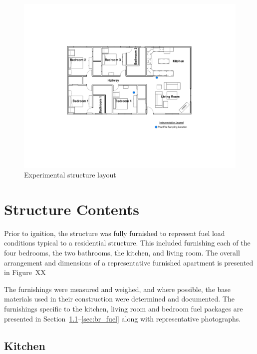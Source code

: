 \documentclass[12pt,oneside]{book}
\begin{document}
\begin{figure}[!htb]
	\includegraphics[width=1.1\linewidth]{../06_Figures/Sampling_Location}
	\caption{Experimental structure layout}
	\label{fig:Floor_Plan}
\end{figure}


\section{Structure Contents}

Prior to ignition, the structure was fully furnished to represent fuel load conditions typical to a residential structure. This included furnishing each of the four bedrooms, the two bathrooms, the kitchen, and living room. The overall arrangement and dimensions of a representative furnished apartment is presented in Figure~XX


The furnishings were measured and weighed, and where possible, the base materials used in their construction were determined and documented. The furnishings specific to the kitchen, living room and bedroom fuel packages are presented in Section~\ref{sec:kit_fuel}--\ref{sec:br_fuel} along with representative photographs.

\subsection{Kitchen}
\label{sec:kit_fuel}
\end{document}
